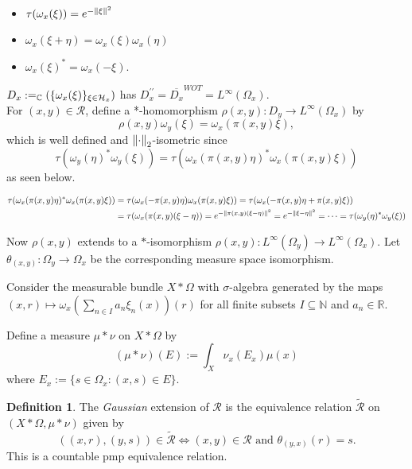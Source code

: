 \documentclass[12pt]{article}
\newcommand{\sub}{\subseteq}
\newcommand{\lr}[1]{\left(#1\right)}
\newcommand{\C}{\mathbb{C}}
\newcommand{\N}{\mathbb{N}\xspace}
\newcommand{\R}{\mathbb{R}\xspace}
\renewcommand{\H}{\mathcal{H}}
\let\Span\relax
\DeclareMathOperator{\Span}{Span}
\newcommand*\cls[1]{\overline{#1}}
\theoremstyle{definition}
\newtheorem{definition}{Definition}[]
\theoremstyle{plain}
\theoremstyle{remark}
\begin{document}
\begin{itemize}
    \item $ \tau(\omega_{x}(\xi)) = e^{-\norm{\xi}^{2}} $ 
    \item $ \omega_{x}(\xi+\eta) = \omega_{x}(\xi) \omega_{x}(\eta) $
    \item $ \omega_{x}(\xi)^{*} = \omega_{x}(-\xi) $.
\end{itemize}

$ D_{x}:=\Span_{\C}(\{\omega_{x}(\xi)\}_{\xi\in\H_{x}}) $ has $ D_{x}^{\prime\prime} = \cls{D_{x}}^{WOT} = L^{\infty}(\Omega_{x}) $.\\

For $ (x,y)\in \mathcal{R} $, define a *-homomorphism $ \rho(x,y):D_{y}\to L^{\infty}(\Omega_{x}) $ by 
\[
    \rho(x,y) \omega_{y}(\xi) = \omega_{x}(\pi(x,y) \xi),
\]
which is well defined and $ \norm{\cdot}_{2} $-isometric since 
\[
    \tau(\omega_{y}(\eta)^{*} \omega_{y}(\xi)) = \tau(\omega_{x}(\pi(x,y)\eta)^{*} \omega_{x}(\pi(x,y) \xi))
\]
as seen below. 

\begin{align*}
    \tau(\omega_{x}(\pi(x,y)\eta)^{*} \omega_{x}(\pi(x,y) \xi)) &= \tau(\omega_{x}(-\pi(x,y)\eta) \omega_{x}(\pi(x,y) \xi)) = \tau(\omega_{x}(-\pi(x,y)\eta+ \pi(x,y) \xi))\\
    &= \tau(\omega_{x}(\pi(x,y)(\xi-\eta)) = e^{-\norm{\pi(x,y)(\xi-\eta)}^{2}} = e^{-\norm{\xi-\eta}^{2}} = \cdots = \tau(\omega_{y}(\eta)^{*} \omega_{y}(\xi)) 
\end{align*}

Now $ \rho(x,y) $ extends to a $ * $-isomorphism $ \rho(x,y): L^{\infty}(\Omega_{y})\to L^{\infty}(\Omega_{x}) $. Let $ \theta_{(x,y)}:\Omega_{y}\to \Omega_{x} $ be the corresponding measure space isomorphism.


Consider the measurable bundle $ X\ast \Omega $ with $ \sigma $-algebra generated by the maps $ (x,r)\mapsto \omega_{x}\lr{\sum_{n\in I}a_{n} \xi_{n}(x)}(r) $ for all finite subsets $ I\sub \N $ and $ a_{n}\in\R $.

Define a measure $ \mu\ast \nu $ on $ X\ast \Omega $ by 
\[
    (\mu\ast \nu)(E) := \int_{X} \nu_{x}(E_{x}) \mu(x)
\]
where $ E_{x} := \{s\in \Omega_{x}:(x,s)\in E\} $.

\begin{definition}
    The \textit{Gaussian} extension of $ \mathcal{R} $ is the equivalence relation $ \widetilde{\mathcal{R}} $ on $ (X\ast \Omega, \mu\ast \nu) $ given by 
    \[
        ((x,r),(y,s)) \in \widetilde{\mathcal{R}} \iff (x,y)\in \mathcal{R} \text{ and } \theta_{(y,x)}(r) = s.
    \]
    This is a countable pmp equivalence relation.
\end{definition}
\end{document}
